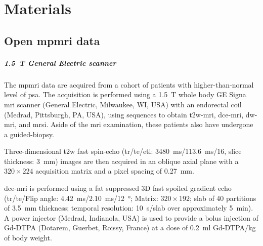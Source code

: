 \chapter{Materials}\label{chap:4}

\section{Open \acs*{mpmri} data}

\paragraph{\SI{1.5}{\tesla} General Electric scanner}

The \ac{mpmri} data are acquired from a cohort of patients with higher-than-normal level of \ac{psa}.
The acquisition is performed using a \SI{1.5}{\tesla} whole body GE Signa \ac{mri} scanner (General Electric, Milwaukee, WI, USA) with an endorectal coil (Medrad, Pittsburgh, PA, USA), using sequences to obtain \ac{t2w}-\ac{mri}, \ac{dce}-\ac{mri}, \ac{dw}-\ac{mri}, and \ac{mrsi}.
Aside of the \ac{mri} examination, these patients also have undergone a guided-biopsy.

Three-dimensional \ac{t2w} fast spin-echo (\ac{tr}/\ac{te}/\ac{etl}: \SI{3480}{\ms}/\SI{113.6}{\ms}/16, slice thickness: \SI{3}{\mm}) images are then acquired in an oblique axial plane with a  $320 \times 224$ acquisition matrix and a pixel spacing of \SI{0.27}{\milli\metre}.


\ac{dce}-\ac{mri} is performed using a fat suppressed 3D fast spoiled gradient echo (\ac{tr}/\ac{te}/Flip angle: \SI{4.42}{\ms}/\SI{2.10}{\ms}/\SI{12}{\degree}; Matrix: $320 \times 192$; slab of 40 partitions of \SI{3.5}{\mm} thickness; temporal resolution: \SI{10}{\s}/slab over approximately \SI{5}{\minute}).
A power injector (Medrad, Indianola, USA) is used to provide a bolus injection of Gd-DTPA (Dotarem, Guerbet, Roissy, France) at a dose of \SI{0.2}{\ml} Gd-DTPA/kg of body weight.

